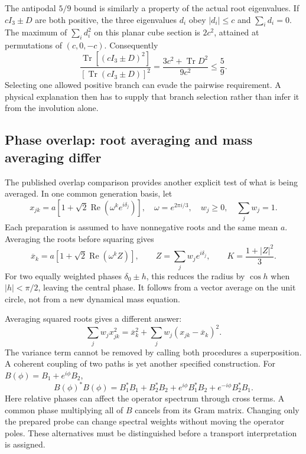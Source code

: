 The antipodal $5/9$ bound is similarly a property of the actual
root eigenvalues. If $cI_3\pm D$ are both positive, the three
eigenvalues $d_i$ obey $|d_i|\leq c$ and $\sum_i d_i=0$.
The maximum of $\sum_i d_i^2$ on this planar cube section is
$2c^2$, attained at permutations of $(c,0,-c)$. Consequently
\begin{equation}
 \frac{\operatorname{Tr}[(cI_3\pm D)^2]}
      {[\operatorname{Tr}(cI_3\pm D)]^2}
 =\frac{3c^2+\operatorname{Tr}D^2}{9c^2}\leq\frac59.
\end{equation}
Selecting one allowed positive branch can evade the pairwise
requirement. A physical explanation then has to supply that branch
selection rather than infer it from the involution alone.

\subsection{Phase overlap: root averaging and mass averaging differ}
The published overlap comparison provides another explicit test of
what is being averaged. In one common generation basis, let
\begin{equation}
 x_{jk}=a[1+\sqrt2\operatorname{Re}(\omega^ke^{i\delta_j})],
 \quad \omega=e^{2\pi i/3},\quad
 w_j\geq0,\quad\sum_jw_j=1.
\end{equation}
Each preparation is assumed to have nonnegative roots and the same
mean $a$. Averaging the roots before squaring gives
\begin{equation}
 \overline x_k=a[1+\sqrt2\operatorname{Re}(\omega^k Z)],
 \qquad Z=\sum_jw_je^{i\delta_j},\qquad
 K=\frac{1+|Z|^2}{3}.
\end{equation}
For two equally weighted phases $\delta_0\pm h$, this reduces the
radius by $\cos h$ when $|h|<\pi/2$, leaving the central phase.
It follows from a vector average on the unit circle, not from a
new dynamical mass equation.

Averaging squared roots gives a different answer:
\begin{equation}
 \sum_jw_jx_{jk}^2=\overline x_k^2+
                      \sum_jw_j(x_{jk}-\overline x_k)^2.
\end{equation}
The variance term cannot be removed by calling both procedures a
superposition. A coherent coupling of two paths is yet another
specified construction. For $B(\phi)=B_1+e^{i\phi}B_2$,
\begin{equation}
 B(\phi)^*B(\phi)=B_1^*B_1+B_2^*B_2+
 e^{i\phi}B_1^*B_2+e^{-i\phi}B_2^*B_1.
\end{equation}
Here relative phases can affect the operator spectrum through cross
terms. A common phase multiplying all of $B$ cancels from its Gram
matrix. Changing only the prepared probe can change spectral weights
without moving the operator poles. These alternatives must be
distinguished before a transport interpretation is assigned.

